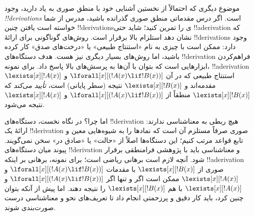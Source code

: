 \documentclass[../../../include/open-logic-section]{subfiles}
\begin{document}
موضوع دیگری که احتمالاً از نخستین آشنایی خود با منطق صوری به یاد دارید،
وجود \emph{!!{derivation}s} است. اگر درس مقدماتی منطق صوری گذرانده
باشید، مدرس از شما خواسته است یافتن چنین !!{derivation}sی را تمرین
کنید؛ شاید حتی !!a{derivation} که نشان دهد استلزام بالا برقرار است.
روش‌های گوناگونی برای ارائهٔ !!{derivation}s وجود دارد: ممکن است با
چیزی به نام «استنتاج طبیعی» یا «درخت‌های صدق» کار کرده باشید، اما
روش‌های بسیار دیگری نیز هست. هدف دستگاه‌های !!{derivation} فراهم‌کردن
ابزارهایی است که بتوان با آن‌ها به پرسش‌های بالا پاسخ داد. برای نمونه،
!!a{derivation} استنتاج طبیعی که در آن
$\lforall[x][(!A(x) \lif !B(x))]$ و $\lexists[x][!A(x)]$ مقدمه‌اند و
$\lexists[x][!B(x)]$ نتیجه (سطر پایانی) است، \emph{تأیید می‌کند} که
$\lexists[x][!B(x)]$ منطقاً از $\lforall[x][(!A(x) \lif !B(x))]$ و
$\lexists[x][!A(x)]$ نتیجه می‌شود.

اما چرا؟ در نگاه نخست، دستگاه‌های !!{derivation} هیچ ربطی به معناشناسی
ندارند: ارائهٔ یک !!{derivation} صوری صرفاً مستلزم آن است که نمادها را
به شیوه‌هایی معین و تابع قواعد مرتب کنیم؛ این دستگاه‌ها اصلاً از «حالت»
یا «صادق در» سخن نمی‌گویند. پیوند میان دستگاه‌های !!{derivation} و
معناشناسی باید با پژوهشی فرامنطقی برقرار شود. آنچه لازم است برهانی
ریاضی است؛ برای نمونه، برهانی بر اینکه !!a{derivation} صوری از
$\lexists[x][!B(x)]$ با مقدمات $\lforall[x][(!A(x) \lif !B(x))]$ و
$\lexists[x][!A(x)]$ ممکن است اگر و تنها اگر
$\lforall[x][(!A(x) \lif !B(x))]$ و $\lexists[x][!A(x)]$ با هم
$\lexists[x][!B(x)]$ را نتیجه دهند. اما پیش از آنکه بتوان چنین کرد،
باید کار دقیق و پرزحمتی انجام داد تا تعریف‌های نحو و معناشناسی درست
صورت‌بندی شوند.
\end{document}
